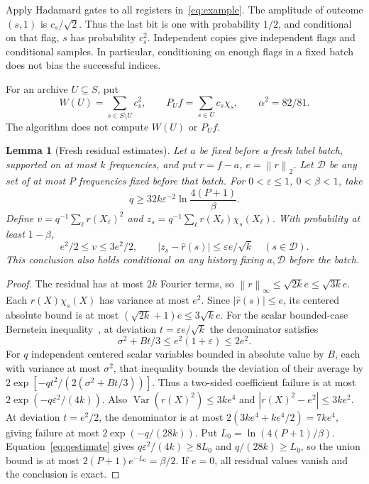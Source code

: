 \documentclass[11pt]{article}
\newtheorem{lemma}[theorem]{Lemma}
\theoremstyle{remark}\newtheorem{remark}[theorem]{Remark}
\newcommand{\norm}[1]{\left\|#1\right\|}
\begin{document}
Apply Hadamard gates to all registers in~\eqref{eq:example}. The amplitude of outcome $(s,1)$ is $c_s/\sqrt2$. Thus the last bit is one with probability $1/2$, and conditional on that flag, $s$ has probability $c_s^2$. Independent copies give independent flags and conditional samples. In particular, conditioning on enough flags in a fixed batch does not bias the successful indices.

For an archive $U\subseteq S$, put
\begin{equation}\label{eq:energy}
 W(U)=\sum_{s\in S\setminus U}c_s^2,\qquad
 P_Uf=\sum_{s\in U}c_s\chi_s,\qquad \alpha^2=82/81.
\end{equation}
The algorithm does not compute $W(U)$ or $P_Uf$.

\begin{lemma}[Fresh residual estimates]\label{lem:estimates}
Let $a$ be fixed before a fresh label batch, supported on at most $k$ frequencies, and put $r=f-a$, $e=\norm r_2$. Let $\mathcal D$ be any set of at most $P$ frequencies fixed before that batch. For $0<\varepsilon\le1$, $0<\beta<1$, take
\begin{equation}\label{eq:qestimate}
 q\ge32k\varepsilon^{-2}\ln\frac{4(P+1)}\beta.
\end{equation}
Define $v=q^{-1}\sum_\ell r(X_\ell)^2$ and $z_s=q^{-1}\sum_\ell r(X_\ell)\chi_s(X_\ell)$.
With probability at least $1-\beta$,
\begin{equation}\label{eq:estimates}
 e^2/2\le v\le3e^2/2,\qquad
 |z_s-\widehat r(s)|\le\varepsilon e/\sqrt k\quad(s\in\mathcal D).
\end{equation}
This conclusion also holds conditional on any history fixing $a,\mathcal D$ before the batch.
\end{lemma}
\begin{proof}
The residual has at most $2k$ Fourier terms, so $\norm r_\infty\le\sqrt{2k}e\le\sqrt{3k}e$. Each $r(X)\chi_s(X)$ has variance at most $e^2$. Since $|\widehat r(s)|\le e$, its centered absolute bound is at most $(\sqrt{2k}+1)e\le3\sqrt k e$. For the scalar bounded-case Bernstein inequality~\cite[Theorem~6.1(ii)]{Tropp}, at deviation $t=\varepsilon e/\sqrt k$ the denominator satisfies
\[
 \sigma^2+Bt/3\le e^2(1+\varepsilon)\le2e^2.
\]
For $q$ independent centered scalar variables bounded in absolute value by $B$, each with variance at most $\sigma^2$, that inequality bounds the deviation of their average by $2\exp[-qt^2/(2(\sigma^2+Bt/3))]$. Thus a two-sided coefficient failure is at most $2\exp(-q\varepsilon^2/(4k))$.
Also $\operatorname{Var}(r(X)^2)\le3ke^4$ and $|r(X)^2-e^2|\le3ke^2$. At deviation $t=e^2/2$, the denominator is at most $2(3ke^4+ke^4/2)=7ke^4$, giving failure at most $2\exp(-q/(28k))$. Put $L_0=\ln(4(P+1)/\beta)$. Equation~\eqref{eq:qestimate} gives $q\varepsilon^2/(4k)\ge8L_0$ and $q/(28k)\ge L_0$, so the union bound is at most $2(P+1)e^{-L_0}=\beta/2$. If $e=0$, all residual values vanish and the conclusion is exact.
\end{proof}
\end{document}
